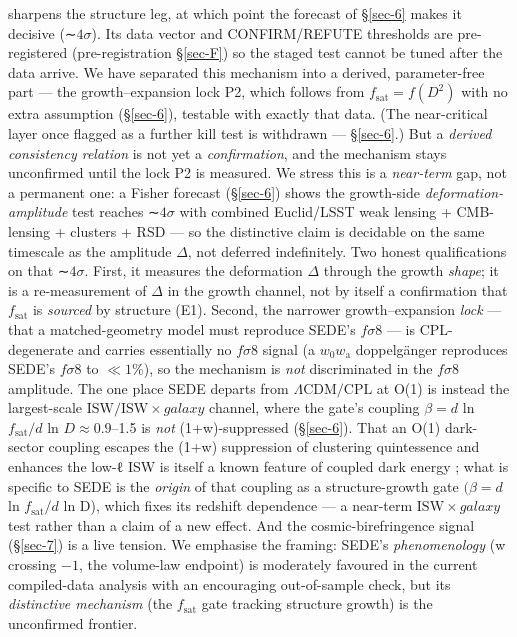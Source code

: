 \documentclass[preprint,12pt]{elsarticle}
\begin{document}
sharpens the structure leg, at which point the forecast of §\ref{sec-6}
makes it decisive (∼\(4\sigma\)). Its data vector and CONFIRM/REFUTE
thresholds are pre-registered (pre-registration §\ref{sec-F}) so the
staged test cannot be tuned after the data arrive. We have separated
this mechanism into a derived, parameter-free part --- the
growth--expansion lock P2, which follows from
\(f_{\mathrm{sat}} = f(D^{2})\) with no extra assumption (§\ref{sec-6}),
testable with exactly that data. (The near-critical layer once flagged
as a further kill test is withdrawn --- §\ref{sec-6}.) But a
\emph{derived consistency relation} is not yet a \emph{confirmation},
and the mechanism stays unconfirmed until the lock P2 is measured. We
stress this is a \emph{near-term} gap, not a permanent one: a Fisher
forecast (§\ref{sec-6}) shows the growth-side
\emph{deformation-amplitude} test reaches ∼\(4\sigma\) with combined
Euclid/LSST weak lensing + CMB-lensing + clusters + RSD --- so the
distinctive claim is decidable on the same timescale as the amplitude
\(\Delta\), not deferred indefinitely. Two honest qualifications on that
∼\(4\sigma\). First, it measures the deformation \(\Delta\) through the
growth \emph{shape}; it is a re-measurement of \(\Delta\) in the growth
channel, not by itself a confirmation that \(f_{\mathrm{sat}}\) is
\emph{sourced} by structure (E1). Second, the narrower growth--expansion
\emph{lock} --- that a matched-geometry model must reproduce SEDE's
\(f\sigma 8\) --- is CPL-degenerate and carries essentially no
\(f\sigma 8\) signal (a \(w_{0}w_{\mathrm{a}}\) doppelgänger reproduces
SEDE's \(f\sigma 8\) to \(\ll 1\)\%), so the mechanism is \emph{not}
discriminated in the \(f\sigma 8\) amplitude. The one place SEDE departs
from \(\Lambda \mathrm{CDM}/\mathrm{CPL}\) at O(1) is instead the
largest-scale \(\mathrm{ISW}/\mathrm{ISW}\times galaxy\) channel, where
the gate's coupling \(\beta  = d\) ln \(f_{\mathrm{sat}}/d\) ln
\(D \approx  0.9\)--1.5 is \emph{not} (1+w)-suppressed (§\ref{sec-6}).
That an O(1) dark-sector coupling escapes the (1+w) suppression of
clustering quintessence and enhances the low-ℓ ISW is itself a known
feature of coupled dark energy
\citep{Schafer:2008uc, Mainini:2007ft, Hu:2004yd}; what is specific to
SEDE is the \emph{origin} of that coupling as a structure-growth gate
\((\beta  = d\) ln \(f_{\mathrm{sat}}/d\) ln D), which fixes its
redshift dependence --- a near-term \(\mathrm{ISW}\times galaxy\) test
rather than a claim of a new effect. And the cosmic-birefringence signal
(§\ref{sec-7}) is a live tension. We emphasise the framing: SEDE's
\emph{phenomenology} (w crossing \(-1\), the volume-law endpoint) is
moderately favoured in the current compiled-data analysis with an
encouraging out-of-sample check, but its \emph{distinctive mechanism}
(the \(f_{\mathrm{sat}}\) gate tracking structure growth) is the
unconfirmed frontier.
\end{document}
